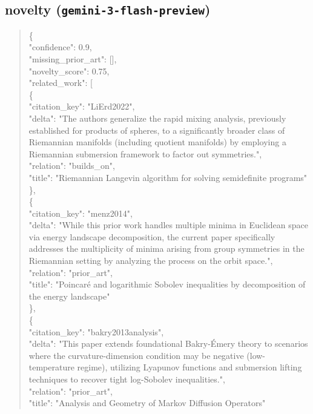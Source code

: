 \documentclass[11pt]{article}
\begin{document}
\subsection*{novelty (\texttt{gemini-3-flash-preview})}
\begin{quote}\small\ttfamily\raggedright
\{\\
  "confidence": 0.9,\\
  "missing\_prior\_art": [],\\
  "novelty\_score": 0.75,\\
  "related\_work": [\\
    \{\\
      "citation\_key": "LiErd2022",\\
      "delta": "The authors generalize the rapid mixing analysis, previously established for products of spheres, to a significantly broader class of Riemannian manifolds (including quotient manifolds) by employing a Riemannian submersion framework to factor out symmetries.",\\
      "relation": "builds\_on",\\
      "title": "Riemannian Langevin algorithm for solving semidefinite programs"\\
    \},\\
    \{\\
      "citation\_key": "menz2014",\\
      "delta": "While this prior work handles multiple minima in Euclidean space via energy landscape decomposition, the current paper specifically addresses the multiplicity of minima arising from group symmetries in the Riemannian setting by analyzing the process on the orbit space.",\\
      "relation": "prior\_art",\\
      "title": "Poincaré and logarithmic Sobolev inequalities by decomposition of the energy landscape"\\
    \},\\
    \{\\
      "citation\_key": "bakry2013analysis",\\
      "delta": "This paper extends foundational Bakry-Émery theory to scenarios where the curvature-dimension condition may be negative (low-temperature regime), utilizing Lyapunov functions and submersion lifting techniques to recover tight log-Sobolev inequalities.",\\
      "relation": "prior\_art",\\
      "title": "Analysis and Geometry of Markov Diffusion Operators"\\

\end{quote}
\end{document}
